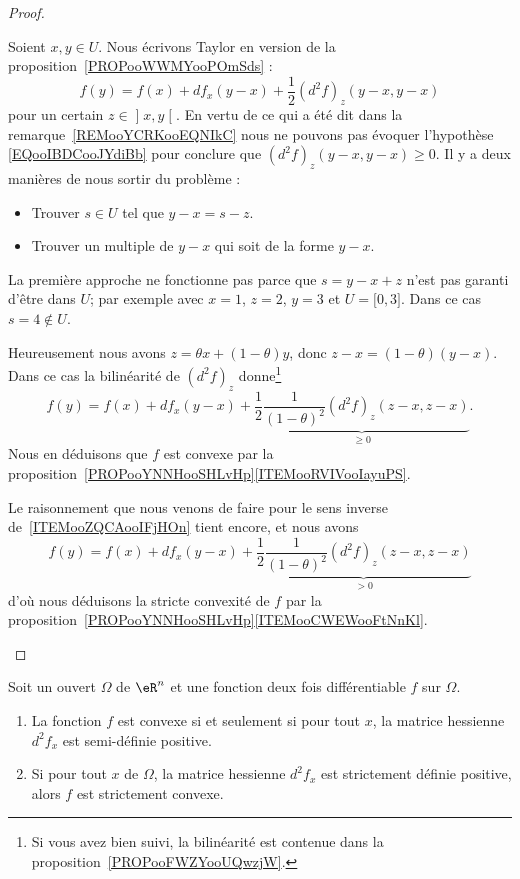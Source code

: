 \begin{proof}
\begin{subproof}
		Soient \( x,y\in U\). Nous écrivons Taylor en version de la proposition~\ref{PROPooWWMYooPOmSds} :
		\begin{equation}
			f(y)=f(x)+df_x(y-x)+\frac{ 1 }{2}(d^2f)_z(y-x,y-x)
		\end{equation}
		pour un certain \( z\in\mathopen] x , y \mathclose[\). En vertu de ce qui a été dit dans la remarque~\ref{REMooYCRKooEQNIkC} nous ne pouvons pas évoquer l'hypothèse \eqref{EQooIBDCooJYdiBb} pour conclure que \( (d^2f)_z(y-x,y-x)\geq 0\). Il y a deux manières de nous sortir du problème :
		\begin{itemize}
			\item Trouver \( s\in U\) tel que \( y-x=s-z\).
			\item Trouver un multiple de \( y-x\) qui soit de la forme \( y-x\).
		\end{itemize}
		La première approche ne fonctionne pas parce que \( s=y-x+z\) n'est pas garanti d'être dans \( U\); par exemple avec \( x=1\), \( z=2\), \( y=3\) et \( U=\mathopen[ 0 , 3 \mathclose]\). Dans ce cas \( s=4\notin U\).

		Heureusement nous avons \( z=\theta x+(1-\theta)y\), donc \( z-x=(1-\theta)(y-x)\). Dans ce cas la bilinéarité de \( (d^2f)_z\) donne\footnote{Si vous avez bien suivi, la bilinéarité est contenue dans la proposition~\ref{PROPooFWZYooUQwzjW}.}
		\begin{equation}
			f(y)=f(x)+df_x(y-x)+\underbrace{\frac{ 1 }{2}\frac{1}{ (1-\theta)^2 }(d^2f)_z(z-x,z-x)}_{\geq 0}.
		\end{equation}
		Nous en déduisons que \( f\) est convexe par la proposition~\ref{PROPooYNNHooSHLvHp}\ref{ITEMooRVIVooIayuPS}.

		\spitem[\ref{ITEMooHAGQooYZyhQk}]

		Le raisonnement que nous venons de faire pour le sens inverse de~\ref{ITEMooZQCAooIFjHOn} tient encore, et nous avons
		\begin{equation}
			f(y)=f(x)+df_x(y-x)+\underbrace{\frac{ 1 }{2}\frac{1}{ (1-\theta)^2 }(d^2f)_z(z-x,z-x)}_{> 0}
		\end{equation}
		d'où nous déduisons la stricte convexité de \( f\) par la proposition~\ref{PROPooYNNHooSHLvHp}\ref{ITEMooCWEWooFtNnKl}.
	\end{subproof}
\end{proof}

\begin{corollary}       \label{CORooMBQMooWBAIIH}
	Soit un ouvert \( \Omega\) de \( \eR^n\) et une fonction deux fois différentiable \( f\) sur \( \Omega\).
	\begin{enumerate}
		\item   \label{ITEMooUAFTooXfCviI}
		      La fonction \( f\) est convexe si et seulement si pour tout \( x\), la matrice hessienne \( d^2f_x\) est semi-définie positive.
		\item   \label{ITEMooDGISooPlRLOd}
		      Si pour tout \( x\) de \( \Omega\), la matrice hessienne \( d^2f_x\) est strictement définie positive, alors \( f \) est strictement convexe.
	\end{enumerate}
\end{corollary}

